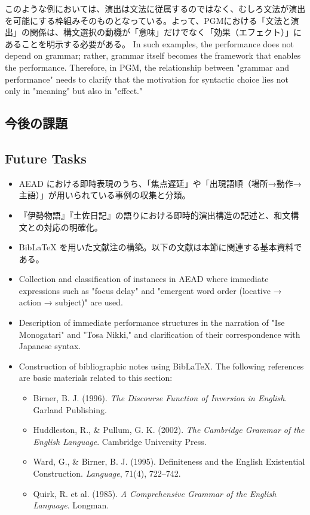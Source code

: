 \ifJPN
このような例においては、演出は文法に従属するのではなく、むしろ文法が演出を可能にする枠組みそのものとなっている。よって、PGMにおける「文法と演出」の関係は、構文選択の動機が「意味」だけでなく「効果（エフェクト）」にあることを明示する必要がある。
\else
In such examples, the performance does not depend on grammar; rather, grammar itself becomes the framework that enables the performance. Therefore, in PGM, the relationship between "grammar and performance" needs to clarify that the motivation for syntactic choice lies not only in "meaning" but also in "effect."
\fi


\ifJPN
\subsection*{今後の課題}
\else
\subsection*{Future Tasks}
\fi

\begin{itemize}
  \ifJPN
  \item AEAD における即時表現のうち、「焦点遅延」や「出現語順（場所→動作→主語）」が用いられている事例の収集と分類。
  \item 『伊勢物語』『土佐日記』の語りにおける即時的演出構造の記述と、和文構文との対応の明確化。
  \item BibLaTeX を用いた文献注の構築。以下の文献は本節に関連する基本資料である。

  \else

  \item Collection and classification of instances in AEAD where immediate expressions such as "focus delay" and "emergent word order (locative → action → subject)" are used.
  \item Description of immediate performance structures in the narration of "Ise Monogatari" and "Tosa Nikki," and clarification of their correspondence with Japanese syntax.
  \item Construction of bibliographic notes using BibLaTeX. The following references are basic materials related to this section:

\fi

  \begin{itemize}
      \item Birner, B. J. (1996). \textit{The Discourse Function of Inversion in English}. Garland Publishing.
      \item Huddleston, R., \& Pullum, G. K. (2002). \textit{The Cambridge Grammar of the English Language}. Cambridge University Press.
      \item Ward, G., \& Birner, B. J. (1995). Definiteness and the English Existential Construction. \textit{Language}, 71(4), 722–742.
      \item Quirk, R. et al. (1985). \textit{A Comprehensive Grammar of the English Language}. Longman.
    \end{itemize}
\end{itemize}
\fi
